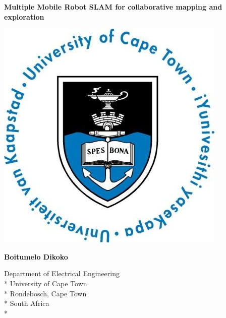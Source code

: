 \documentclass[a4paper, 12pt, oneside, openright, parskip=full]{book}
\newcommand{\auth}{Boitumelo Dikoko}								%
\newcommand{\titl}{Multiple Mobile Robot SLAM for collaborative mapping and exploration}						%
\newcommand{\subtitle}{Subtitle}						%
\newcommand{\dept}{Department of Electrical Engineering}%
\newcommand{\uni}{University of Cape Town}				%
\newcommand{\city}{Rondebosch, Cape Town}				%
\newcommand{\country}{South Africa}						%
\newcommand{\logo}										%
{	
	\includegraphics[scale = 0.3]{figs/uctLogo}
}
\begin{document}
\begin{titlepage}
	\centering
	\vspace*{1cm}

	\begin{Huge}					
		\bfseries\titl\par
		\vskip 5mm
	\end{Huge}
	\logo							
	\vskip 1.5cm	
	\begin{Large}					
		\bfseries\auth\\
	\end{Large}
	\begin{normalsize}				
		\vskip 2mm	
		\dept\\*
		\uni\\*
		\city\\*
		\country\\*
		

\end{normalsize}
\end{titlepage}
\end{document}
